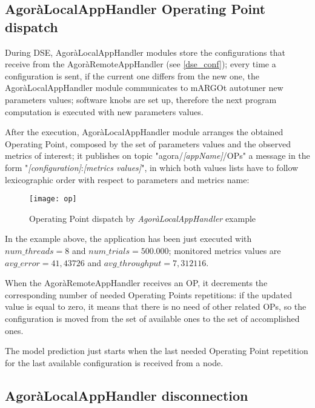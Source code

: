 \subsection{AgoràLocalAppHandler Operating Point dispatch}\label{opSend}

During DSE, AgoràLocalAppHandler modules store the configurations that receive from the AgoràRemoteAppHandler (see \ref{dse_conf}); every time a configuration is sent, if the current one differs from the new one, the AgoràLocalAppHandler module communicates to mARGOt autotuner new parameters values; software knobs are set up, therefore the next program computation is executed with new parameters values.

After the execution, AgoràLocalAppHandler module arranges the obtained Operating Point, composed by the set of parameters values and the observed metrics of interest; it publishes on topic "agora/\textit{[appName]}/OPs" a message in the form "\textit{[configuration]}:\textit{[metrics values]}", in which both values lists have to follow lexicographic order with respect to parameters and metrics name:

\begin{figure}[H]

    \centering
    \texttt{[image: op]}
    \caption{Operating Point dispatch by \textit{AgoràLocalAppHandler} example}
    \label{fig:op}
    
\end{figure}

In the example above, the application has been just executed with\linebreak $num\_threads = 8$ and $num\_trials = 500.000$; monitored metrics values are $avg\_error = 41,43726$ and $avg\_throughput = 7,312116$.

When the AgoràRemoteAppHandler receives an OP, it decrements the corresponding number of needed Operating Points repetitions: if the updated value is equal to zero, it means that there is no need of other related OPs, so the configuration is moved from the set of available ones to the set of accomplished ones.

The model prediction just starts when the last needed Operating Point repetition for the last available configuration is received from a node.





\subsection{AgoràLocalAppHandler disconnection}\label{client_disc}


